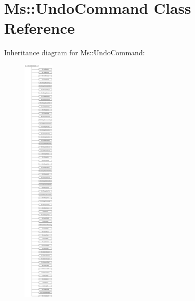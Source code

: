 \hypertarget{class_ms_1_1_undo_command}{}\section{Ms\+:\+:Undo\+Command Class Reference}
\label{class_ms_1_1_undo_command}
Inheritance diagram for Ms\+:\+:Undo\+Command\+:\begin{figure}[H]
\begin{center}
\leavevmode
\includegraphics[height=12.000000cm]{class_ms_1_1_undo_command}
\end{center}
\end{figure}
